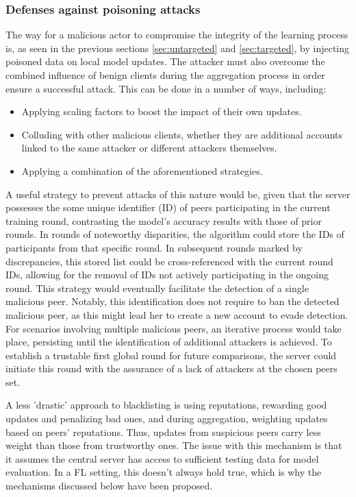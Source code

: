 \subsubsection{Defenses against poisoning attacks}\label{sec:defenses}
The way for a malicious actor to compromise the integrity of the learning process is, as seen in the previous sections \ref{sec:untargeted} and \ref{sec:targeted}, by injecting poisoned data on local model updates. The attacker must also overcome the combined influence of benign clients during the aggregation process in order ensure a successful attack. This can be done in a number of ways, including:
\begin{itemize}
        \item Applying scaling factors to boost the impact of their own updates.
        \item Colluding with other malicious clients, whether they are additional accounts linked to the same attacker or different attackers themselves.
        \item Applying a combination of the aforementioned strategies.
\end{itemize}

A useful strategy to prevent attacks of this nature would be, given that the server possesses the some unique identifier (ID) of peers participating in the current training round, contrasting the model's accuracy results with those of prior rounds. In rounds of noteworthy disparities, the algorithm could store the IDs of participants from that specific round. In subsequent rounds marked by discrepancies, this stored list could be cross-referenced with the current round IDs, allowing for the removal of IDs not actively participating in the ongoing round. This strategy would eventually facilitate the detection of a single malicious peer. Notably, this identification does not require to ban the detected malicious peer, as this might lead her to create a new account to evade detection.
For scenarios involving multiple malicious peers, an iterative process would take place, persisting until the identification of additional attackers is achieved. To establish a trustable first global round for future comparisons, the server could initiate this round with the assurance of a lack of attackers at the chosen peers set.


A less 'drastic' approach to blacklisting is using reputations, rewarding good updates and penalizing bad ones, and during aggregation, weighting updates based on peers' reputations. Thus, updates from suspicious peers carry less weight than those from trustworthy ones.
The issue with this mechanism is that it assumes the central server has access to sufficient testing data for model evaluation. In a FL setting, this doesn't always hold true, which is why the mechanisms discussed below have been proposed.



